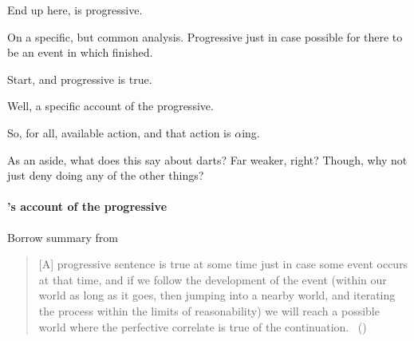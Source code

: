 \begin{note}
  End up here, is progressive.

  On a specific, but common analysis.
  Progressive just in case possible for there to be an event in which finished.

  Start, and progressive is true.

  Well, a specific account of the progressive.

  So, for all, available action, and that action is \(\alpha\)ing.

  As an aside, what does this say about darts?
  Far weaker, right?
  Though, why not just deny doing any of the other things?
\end{note}

\paragraph{\citeauthor{Landman:1992wh}'s account of the progressive}
\nocite{Portner:1998um}
\nocite{Engelberg:1999vi}

\begin{note}
  Borrow summary from \citeauthor{Szabo:2004ul}
  \begin{quote}
    [A] progressive sentence is true at some time just in case some event occurs at that time, and if we follow the development of the event (within our world as long as it goes, then jumping into a nearby world, and iterating the process within the limits of reasonability) we will reach a possible world where the perfective correlate is true of the continuation.%
    \mbox{ }\hfill\mbox{(\citeyear[34]{Szabo:2004ul})}
  \end{quote}
\end{note}

